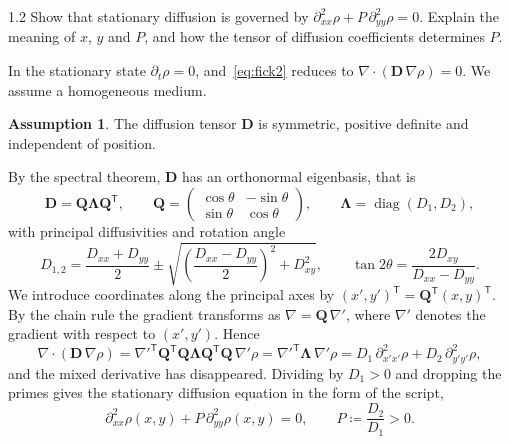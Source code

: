 \documentclass[11pt,a4paper]{article}
\numberwithin{equation}{section}
\theoremstyle{definition}
\newtheorem{assumption}{Assumption}
\theoremstyle{remark}
\newcommand{\grad}{\nabla}
\newcommand{\bD}{\mathbf{D}}
\newcommand{\bQ}{\mathbf{Q}}
\newcommand{\bLambda}{\bm{\Lambda}}
\begin{document}
\begin{task}{1.2}
  Show that stationary diffusion is governed by
  $\partial^2_{xx}\rho + P\,\partial^2_{yy}\rho = 0$. Explain the meaning of $x$, $y$ and $P$,
  and how the tensor of diffusion coefficients determines $P$.
\end{task}

In the stationary state $\partial_t\rho = 0$, and~\eqref{eq:fick2} reduces to
$\grad\cdot(\bD\,\grad\rho) = 0$. We assume a homogeneous medium.

\begin{assumption}\label{ass:homogeneous}
  The diffusion tensor $\bD$ is symmetric, positive definite and independent of position.
\end{assumption}

By the spectral theorem, $\bD$ has an orthonormal eigenbasis, that is
\begin{equation}\label{eq:spectral}
  \bD = \bQ\bLambda\bQ^{\mathsf{T}},
  \qquad
  \bQ =
  \begin{pmatrix}
    \cos\theta & -\sin\theta \\
    \sin\theta & \cos\theta
  \end{pmatrix},
  \qquad
  \bLambda = \operatorname{diag}(D_1, D_2),
\end{equation}
with principal diffusivities and rotation angle
\begin{equation}\label{eq:eigen}
  D_{1,2} = \frac{D_{xx} + D_{yy}}{2}
  \pm \sqrt{\left(\frac{D_{xx} - D_{yy}}{2}\right)^2 + D_{xy}^2},
  \qquad
  \tan 2\theta = \frac{2D_{xy}}{D_{xx} - D_{yy}}.
\end{equation}
We introduce coordinates along the principal axes by $(x', y')^{\mathsf{T}} =
\bQ^{\mathsf{T}}(x, y)^{\mathsf{T}}$. By the chain rule the gradient transforms as
$\grad = \bQ\,\grad'$, where $\grad'$ denotes the gradient with respect to $(x', y')$.
Hence
\begin{equation}\label{eq:rotation}
  \grad\cdot\left(\bD\,\grad\rho\right)
  = \grad'^{\mathsf{T}}\bQ^{\mathsf{T}}\bQ\bLambda\bQ^{\mathsf{T}}\bQ\,\grad'\rho
  = \grad'^{\mathsf{T}}\bLambda\,\grad'\rho
  = D_1\,\partial^2_{x'x'}\rho + D_2\,\partial^2_{y'y'}\rho,
\end{equation}
and the mixed derivative has disappeared. Dividing by $D_1 > 0$ and dropping the primes
gives the stationary diffusion equation in the form of the script,
\begin{equation}\label{eq:stationary}
  \boxed{\;
    \partial^2_{xx}\rho(x,y) + P\,\partial^2_{yy}\rho(x,y) = 0,
    \qquad
    P \coloneqq \frac{D_2}{D_1} > 0.
  \;}
\end{equation}
\end{document}
